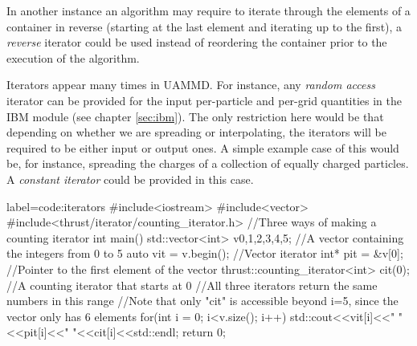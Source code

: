 \documentclass[ twoside,openright,titlepage,numbers=noenddot,%
headinclude,footinclude,cleardoublepage=empty,abstract=on,
BCOR=5mm,paper=b5,fontsize=11pt, dvipsnames
]{scrreprt}
\newcommand{\uammd}{\gls{UAMMD}\xspace}
\begin{document}
In another instance an algorithm may require to iterate through the elements of a container in reverse (starting at the last element and iterating up to the first), a \emph{reverse} iterator could be used instead of reordering the container prior to the execution of the algorithm.

Iterators appear many times in \uammd. For instance, any \emph{random access} iterator can be provided for the input per-particle and per-grid quantities in the \gls{IBM} module (see chapter \ref{sec:ibm}). The only restriction here would be that depending on whether we are spreading or interpolating, the iterators will be required to be either input or output ones. A simple example case of this would be, for instance, spreading the charges of a collection of equally charged particles. A \emph{constant iterator} could be provided in this case.

\begin{code2} {label=code:iterators}
#include<iostream>
#include<vector>
#include<thrust/iterator/counting_iterator.h>
//Three ways of making a counting iterator
int main(){
  std::vector<int> v{0,1,2,3,4,5}; //A vector containing the integers from 0 to 5
  auto vit = v.begin(); //Vector iterator
  int* pit = &v[0];     //Pointer to the first element of the vector
  thrust::counting_iterator<int> cit(0); //A counting iterator that starts at 0
  //All three iterators return the same numbers in this range
  //Note that only "cit" is accessible beyond i=5, since the vector only has 6 elements
  for(int i = 0; i<v.size(); i++){
    std::cout<<vit[i]<<" "<<pit[i]<<" "<<cit[i]<<std::endl;
  }
  return 0;
}
\end{code2}
\end{document}
